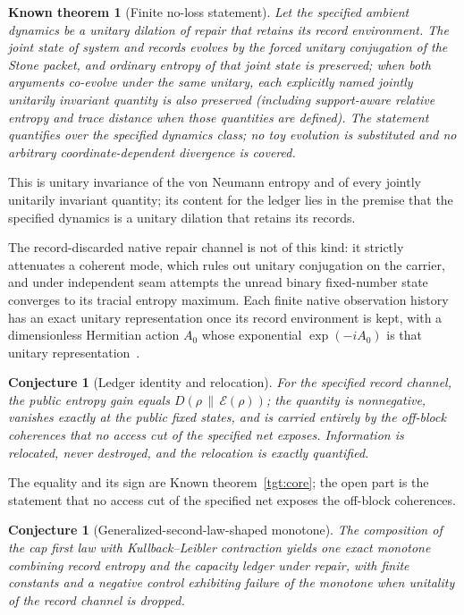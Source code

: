 \documentclass[11pt]{article}
\newtheorem{conjecture}[theorem]{Conjecture}
\newtheorem{known}[theorem]{Known theorem}
\theoremstyle{remark}
\newcommand{\KL}[2]{D\!\left(#1\,\middle\|\,#2\right)}
\begin{document}
\begin{known}[Finite no-loss statement]
\label{tgt:noloss}
Let the specified ambient dynamics be a unitary dilation of repair that
retains its record environment. The joint state of system and records
evolves by the forced unitary conjugation of the Stone packet, and ordinary
entropy of that joint state is preserved; when both arguments co-evolve under the same
unitary, each explicitly named jointly unitarily invariant quantity is
also preserved (including support-aware relative entropy and trace
distance when those quantities are defined). The statement quantifies over the specified
dynamics class; no toy evolution is substituted and no arbitrary
coordinate-dependent divergence is covered.
\end{known}

This is unitary invariance of the von Neumann entropy and of every jointly
unitarily invariant quantity; its content for the ledger lies in the premise
that the specified dynamics is a unitary dilation that retains its records.

The record-discarded native repair channel is not of this kind: it strictly
attenuates a coherent mode, which rules out unitary conjugation on the
carrier, and under independent seam attempts the unread binary
fixed-number state converges to its tracial entropy maximum. Each finite
native observation history has an exact unitary representation once its
record environment is kept, with a dimensionless Hermitian action \(A_0\)
whose exponential \(\exp(-iA_0)\) is that unitary
representation~\cite{ophmodel,ophnativeaction,ophmixing}.

\begin{conjecture}[Ledger identity and relocation]
\label{tgt:ledger}
For the specified record channel, the public entropy gain equals
$\KL{\rho}{\mathcal E(\rho)}$; the quantity is nonnegative, vanishes
exactly at the public fixed states, and is carried entirely by the off-block
coherences that no access cut of the specified net exposes. Information
is relocated, never destroyed, and the relocation is exactly quantified.
\end{conjecture}

The equality and its sign are Known theorem~\ref{tgt:core}; the open part is
the statement that no access cut of the specified net exposes the off-block
coherences.

\begin{conjecture}[Generalized-second-law-shaped monotone]
The composition of the cap first law with Kullback--Leibler contraction
yields one exact monotone combining record entropy and the capacity
ledger under repair, with finite constants and a negative control
exhibiting failure of the monotone when unitality of the record channel
is dropped.
\end{conjecture}
\end{document}
